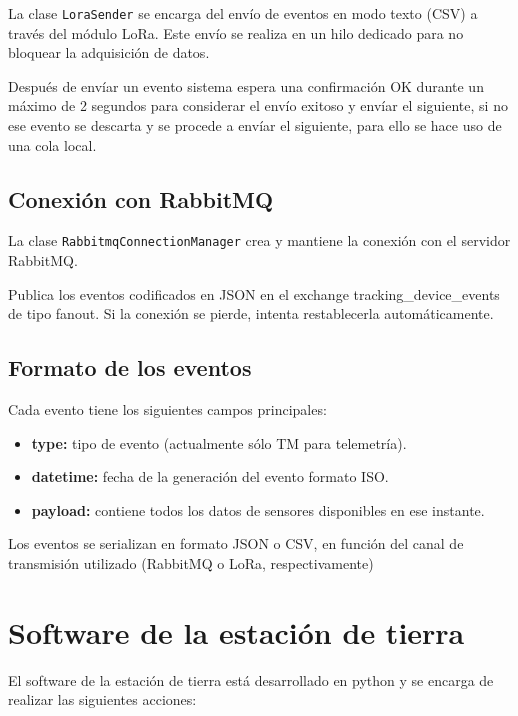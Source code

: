 La clase \texttt{LoraSender} se encarga del envío de eventos en modo texto (CSV) a través del módulo LoRa.
Este envío se realiza en un hilo dedicado para no bloquear la adquisición de datos.

Después de envíar un evento sistema espera una confirmación OK durante un máximo de 2 segundos para considerar el envío exitoso y envíar el siguiente,
si no ese evento se descarta y se procede a envíar el siguiente, para ello se hace uso de una cola local.

\subsection{Conexión con RabbitMQ}

La clase \texttt{RabbitmqConnectionManager} crea y mantiene la conexión con el servidor RabbitMQ.

Publica los eventos codificados en JSON en el exchange tracking\_device\_events de tipo fanout.
Si la conexión se pierde, intenta restablecerla automáticamente.

\subsection{Formato de los eventos}

Cada evento tiene los siguientes campos principales:

\begin{itemize}
    \item \textbf{type:} tipo de evento (actualmente sólo TM para telemetría).
    \item \textbf{datetime:} fecha de la generación del evento formato ISO.
    \item \textbf{payload:} contiene todos los datos de sensores disponibles en ese instante.
\end{itemize}

Los eventos se serializan en formato JSON o CSV, en función del canal de transmisión utilizado (RabbitMQ o LoRa, respectivamente)


\section{Software de la estación de tierra}

El software de la estación de tierra está desarrollado en python y se encarga de realizar las siguientes acciones:

